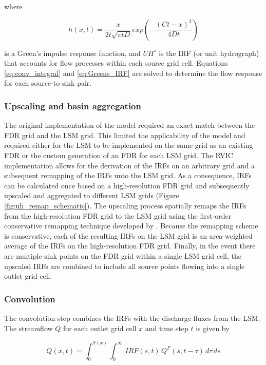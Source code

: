 where

 \begin{equation}
   \label{eq:Greens_IRF}
	h(x, t) = \frac{x}{2t\sqrt{\pi tD}}exp\left(-\frac{(Ct-x)^2}{4Dt}\right)
 \end{equation}

is a Green's impulse response function, and $UH^{\circ}$ is the IRF (or unit hydrograph) that accounts for flow processes within each source grid cell.
Equations \ref{eq:conv_integral} and \ref{eq:Greens_IRF} are solved to determine the flow response for each source-to-sink pair.

\subsubsection{Upscaling and basin aggregation}
\label{sec:remap}

The original implementation of the \citet{Lohmann_1996} model required an exact match between the FDR grid and the LSM grid.
This limited the applicability of the model and required either for the LSM to be implemented on the same grid as an existing FDR or the custom generation of an FDR for each LSM grid.
The RVIC implementation allows for the derivation of the IRFs on an arbitrary grid and a subsequent remapping of the IRFs unto the LSM grid.
As a consequence, IRFs can be calculated once based on a high-resolution FDR grid and subsequently upscaled and aggregated to different LSM grids (Figure \ref{fig:uh_remap_schematic}).
The upscaling process spatially remaps the IRFs from the high-resolution FDR grid to the LSM grid using the first-order conservative remapping technique developed by \citet{Jones_1999}.
Because the remapping scheme is conservative, each of the resulting IRFs on the LSM grid is an area-weighted average of the IRFs on the high-resolution FDR grid.
Finally, in the event there are multiple sink points on the FDR grid within a single LSM grid cell, the upscaled IRFs are combined to include all source points flowing into a single outlet grid cell.

\subsubsection{Convolution}
\label{sec:convolution}

The convolution step combines the IRFs with the discharge fluxes from the LSM.
The streamflow $Q$ for each outlet grid cell $x$ and time step $t$ is given by

\begin{equation}
  \label{eq:convolution}
   Q(x,t) = \int_0^{S(x)} \int_0^{\infty}\,IRF(s,t)\,Q^F(s,t-\tau)\,d\tau\,ds
 \end{equation}

